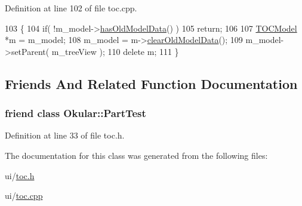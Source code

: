 Definition at line 102 of file toc.\+cpp.


\begin{DoxyCode}
103 \{
104     \textcolor{keywordflow}{if}( !m\_model->\hyperlink{classTOCModel_aa91c6a23d109985b0b058fed64638176}{hasOldModelData}() )
105         \textcolor{keywordflow}{return};
106 
107     \hyperlink{classTOCModel}{TOCModel} *m = m\_model;
108     m\_model = m->\hyperlink{classTOCModel_a09a24dc3c9f6769d2e832f63c5d5b5da}{clearOldModelData}();
109     m\_model->setParent( m\_treeView );
110     \textcolor{keyword}{delete} m;
111 \}
\end{DoxyCode}


\subsection{Friends And Related Function Documentation}
\hypertarget{classTOC_a66a702c391a4aeef37318b6d79c859f1}{
\subsubsection[{Okular\+::\+Part\+Test}]{\setlength{\rightskip}{0pt plus 5cm}friend class {\bf Okular\+::\+Part\+Test}\hspace{0.3cm}{\ttfamily [friend]}}}\label{classTOC_a66a702c391a4aeef37318b6d79c859f1}


Definition at line 33 of file toc.\+h.



The documentation for this class was generated from the following files\+:\begin{DoxyCompactItemize}
\item 
ui/\hyperlink{toc_8h}{toc.\+h}\item 
ui/\hyperlink{toc_8cpp}{toc.\+cpp}\end{DoxyCompactItemize}
